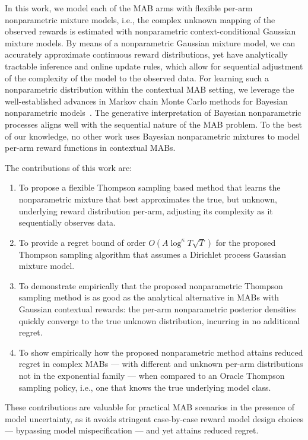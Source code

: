 \documentclass{article}
\newcommand{\ie}{i.e., }
\begin{document}
In this work, we model each of the MAB arms with flexible per-arm nonparametric mixture models, \ie the complex unknown mapping of the observed rewards is estimated with nonparametric context-conditional Gaussian mixture models. By means of a nonparametric Gaussian mixture model, we can accurately approximate continuous reward distributions, yet have analytically tractable inference and online update rules, which allow for sequential adjustment of the complexity of the model to the observed data. For learning such a nonparametric distribution within the contextual MAB setting, we leverage the well-established advances in Markov chain Monte Carlo methods for Bayesian nonparametric models~\cite{j-Neal2000}. The generative interpretation of Bayesian nonparametric processes aligns well with the sequential nature of the MAB problem. To the best of our knowledge, no other work uses Bayesian nonparametric mixtures to model per-arm reward functions in contextual MABs.

The contributions of this work are:
\begin{enumerate}
	\item To propose a flexible Thompson sampling based method that learns the nonparametric mixture that best approximates the true, but unknown, underlying reward distribution per-arm, adjusting its complexity as it sequentially observes data.
	\item To provide a regret bound of order $O(A \log^\kappa T \sqrt{T})$ for the proposed Thompson sampling algorithm that assumes a Dirichlet process Gaussian mixture model.
	\item To demonstrate empirically that the proposed nonparametric Thompson sampling method is as good as the analytical alternative in MABs with Gaussian contextual rewards: the per-arm nonparametric posterior densities quickly converge to the true unknown distribution, incurring in no additional regret.
	\item To show empirically how the proposed nonparametric method attains reduced regret in complex MABs --- with different and unknown per-arm distributions not in the exponential family --- when compared to an Oracle Thompson sampling policy, \ie one that knows the true underlying model class.
\end{enumerate}

These contributions are valuable for practical MAB scenarios in the presence of model uncertainty, as it avoids stringent case-by-case reward model design choices --- bypassing model mispecification --- and yet attains reduced regret.
\end{document}
